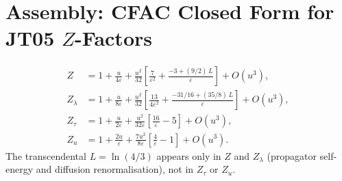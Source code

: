 \documentclass[11pt,a4paper]{article}
\newcommand{\Llog}{\ln(4/3)}
\theoremstyle{definition}
\theoremstyle{plain}
\begin{document}
\section{Assembly: CFAC Closed Form for JT05 $Z$-Factors}
\label{sec:assembly}

\begin{stdbox}
\begin{align}
  Z       &= 1 + \frac{u}{4\varepsilon}
              + \frac{u^2}{32}\!\left[\frac{7}{\varepsilon^2}
              + \frac{-3 + (9/2)\,L}{\varepsilon}\right]
              + O(u^3), \tag{57a}\label{eq:Z}\\
  Z_\lambda &= 1 + \frac{u}{8\varepsilon}
              + \frac{u^2}{32}\!\left[\frac{13}{4\varepsilon^2}
              + \frac{-31/16 + (35/8)\,L}{\varepsilon}\right]
              + O(u^3), \tag{57b}\label{eq:Zlambda}\\
  Z_\tau   &= 1 + \frac{u}{2\varepsilon}
              + \frac{u^2}{32\varepsilon}\!\left[\frac{16}{\varepsilon}
              -5\right] + O(u^3), \tag{57c}\label{eq:Ztau}\\
  Z_u     &= 1 + \frac{2u}{\varepsilon}
              + \frac{7u^2}{8\varepsilon}\!\left[\frac{4}{\varepsilon}
              -1\right] + O(u^3). \tag{57d}\label{eq:Zu}
\end{align}
The transcendental $L = \Llog$ appears only in $Z$ and $Z_\lambda$
(propagator self-energy and diffusion renormalisation), not in
$Z_\tau$ or $Z_u$.
\end{stdbox}
\end{document}
